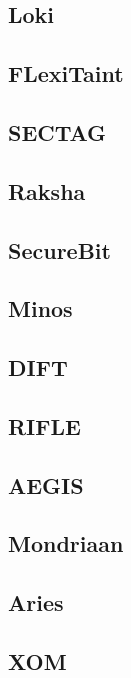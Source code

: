 \subsection{Loki}

\subsection{FLexiTaint}

\subsection{SECTAG}

\subsection{Raksha}

\subsection{SecureBit}

\subsection{Minos}

\subsection{DIFT}

\subsection{RIFLE}

\subsection{AEGIS}

\subsection{Mondriaan}

\subsection{Aries}

\subsection{XOM}

